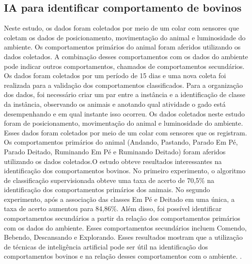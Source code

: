 \subsection*{IA para identificar comportamento de bovinos}

Neste estudo, os dados foram coletados por meio de um colar com sensores que coletam os dados de posicionamento, movimentação do animal e luminosidade do ambiente. Os comportamentos primários do animal foram aferidos utilizando os dados coletados. A combinação desses comportamentos com os dados do ambiente pode indicar outros comportamentos, chamados de comportamentos secundários. Os dados foram coletados por um período de 15 dias e uma nova coleta foi realizada para a validação dos comportamentos classificados. Para a organização dos dados, foi necessário criar um par entre a instância e a identificação de classe da instância, observando os animais e anotando qual atividade o gado está desempenhando e em qual instante isso ocorreu.
Os dados coletados neste estudo foram de posicionamento, movimentação do animal e luminosidade do ambiente. Esses dados foram coletados por meio de um colar com sensores que os registram. Os comportamentos primários do animal (Andando, Pastando, Parado Em Pé, Parado Deitado, Ruminando Em Pé e Ruminando Deitado) foram aferidos utilizando os dados coletados.O estudo obteve resultados interessantes na identificação dos comportamentos bovinos. No primeiro experimento, o algoritmo de classificação supervisionada obteve uma taxa de acerto de 70,5\% na identificação dos comportamentos primários dos animais. No segundo experimento, após a associação das classes Em Pé e Deitado em uma única, a taxa de acerto aumentou para 84,86\%. Além disso, foi possível identificar comportamentos secundários a partir da relação dos comportamentos primários com os dados do ambiente. Esses comportamentos secundários incluem Comendo, Bebendo, Descansando e Explorando. Esses resultados mostram que a utilização de técnicas de inteligência artificial pode ser útil na identificação dos comportamentos bovinos e na relação desses comportamentos com o ambiente. \cite{Fernando.L}.


